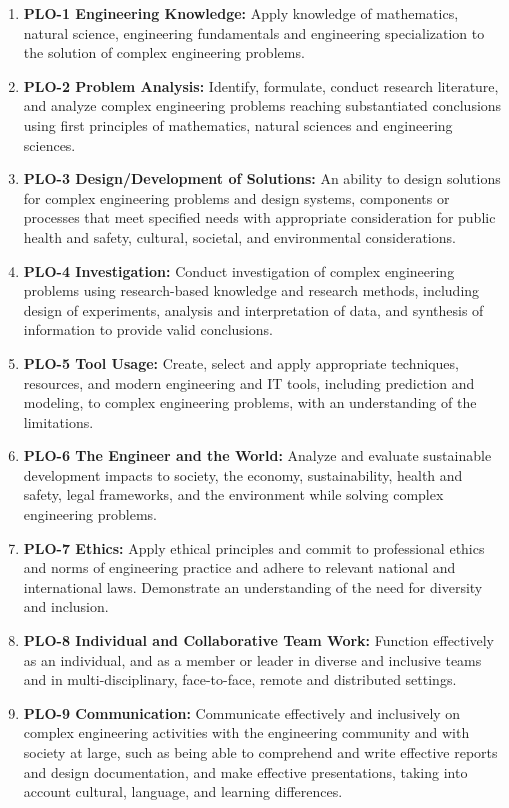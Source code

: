 \begin{enumerate}
\item \textbf{PLO-1 Engineering Knowledge:} Apply knowledge of mathematics, natural science, engineering fundamentals and engineering specialization to the solution of complex engineering problems.
\item \textbf{PLO-2 Problem Analysis:} Identify, formulate, conduct research literature, and analyze complex engineering problems reaching substantiated conclusions using first principles of mathematics, natural sciences and engineering sciences.
\item \textbf{PLO-3 Design/Development of Solutions:} An ability to design solutions for complex engineering problems and design systems, components or processes that meet specified needs with appropriate consideration for public health and safety, cultural, societal, and environmental considerations.
\item \textbf{PLO-4 Investigation:} Conduct investigation of complex engineering problems using research-based knowledge and research methods, including design of experiments, analysis and interpretation of data, and synthesis of information to provide valid conclusions.
\item \textbf{PLO-5 Tool Usage:} Create, select and apply appropriate techniques, resources, and modern engineering and IT tools, including prediction and modeling, to complex engineering problems, with an understanding of the limitations.
\item \textbf{PLO-6 The Engineer and the World:} Analyze and evaluate sustainable development impacts to society, the economy, sustainability, health and safety, legal frameworks, and the environment while solving complex engineering problems.
\item \textbf{PLO-7 Ethics:} Apply ethical principles and commit to professional ethics and norms of engineering practice and adhere to relevant national and international laws. Demonstrate an understanding of the need for diversity and inclusion.
\item \textbf{PLO-8 Individual and Collaborative Team Work:} Function effectively as an individual, and as a member or leader in diverse and inclusive teams and in multi-disciplinary, face-to-face, remote and distributed settings.
\item \textbf{PLO-9 Communication:} Communicate effectively and inclusively on complex engineering activities with the engineering community and with society at large, such as being able to comprehend and write effective reports and design documentation, and make effective presentations, taking into account cultural, language, and learning differences.

\end{enumerate}
